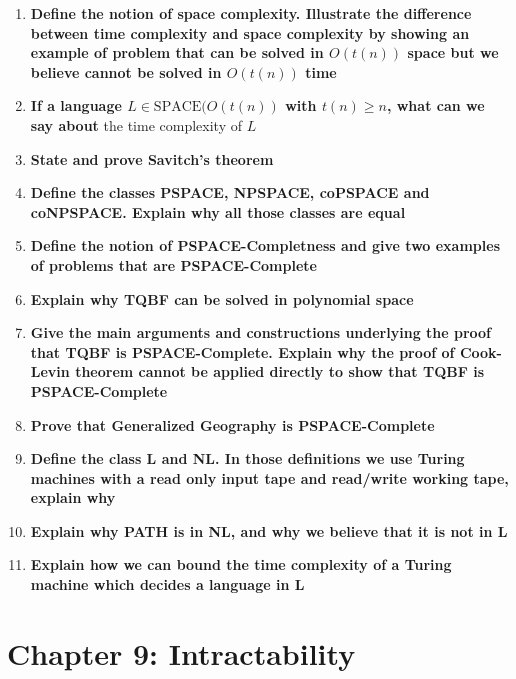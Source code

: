 \documentclass{article}
\begin{document}
\begin{enumerate}{}
\item \textbf{Define the notion of space complexity. Illustrate the difference between time complexity and space complexity by showing an example of problem that can be solved in $O(t(n))$ space but we believe cannot be solved in $O(t(n))$ time}

\item \textbf{If a language $L \in \text{SPACE}(O(t(n))$ with $t(n) \geq n$, what can we say about}
the time complexity of $L$

\item \textbf{State and prove Savitch’s theorem}

\item \textbf{Define the classes PSPACE, NPSPACE, coPSPACE and coNPSPACE. Explain why all those classes are equal}

\item \textbf{Define the notion of PSPACE-Completness and give two examples of problems that are PSPACE-Complete}

\item \textbf{Explain why TQBF can be solved in polynomial space}

\item \textbf{Give the main arguments and constructions underlying the proof that TQBF is PSPACE-Complete. Explain why the proof of Cook-Levin theorem cannot be applied directly to show that TQBF is PSPACE-Complete}

\item \textbf{Prove that Generalized Geography is PSPACE-Complete}

\item \textbf{Define the class L and NL. In those definitions we use Turing machines with a read only input tape and read/write working tape, explain why}

\item \textbf{Explain why PATH is in NL, and why we believe that it is not in L}

\item \textbf{Explain how we can bound the time complexity of a Turing machine which decides a language in L}

\end{enumerate}

\clearpage
\section{Chapter 9: Intractability}
\end{document}
